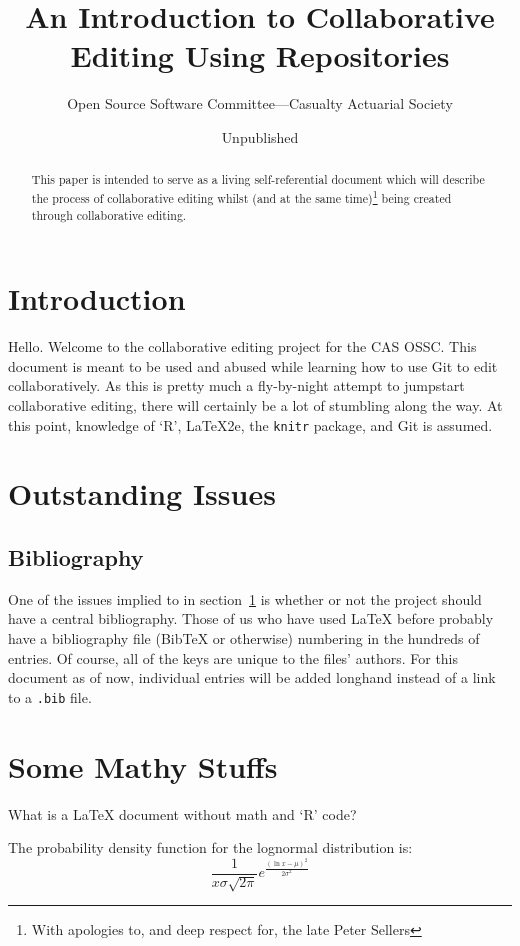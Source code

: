 \documentclass[letterpaper]{article}\usepackage[]{graphicx}\usepackage[]{color}
\begin{document}
\title{An Introduction to Collaborative Editing Using Repositories}
\author{Open Source Software Committee---Casualty Actuarial Society}
\date{Unpublished}

\maketitle
\begin{abstract}
This paper is intended to serve as a living self-referential document which will describe the process of collaborative editing whilst (and at the same time)\footnote{With apologies to, and deep respect for, the late Peter Sellers\citep{TMS219}} being created through collaborative editing.
\end{abstract}
\section{Introduction}\label{Intro}
Hello. Welcome to the collaborative editing project for the CAS OSSC. This document is meant to be used and abused while learning how to use Git to edit collaboratively. As this is pretty much a fly-by-night attempt to jumpstart collaborative editing, there will certainly be a lot of stumbling along the way. At this point, knowledge of `R', \LaTeX2e{}, the \texttt{knitr} package, and Git is assumed. 

\section{Outstanding Issues}\label{Issues}
\subsection{Bibliography}\label{IssueBib}
One of the issues implied to in section~\ref{Intro} is whether or not the project should have a central bibliography. Those of us who have used \LaTeX{} before probably have a bibliography file (BibTeX or otherwise) numbering in the hundreds of entries. Of course, all of the keys are unique to the files' authors. For this document as of now, individual entries will be added longhand instead of a link to a \texttt{.bib} file.

\section{Some Mathy Stuffs}\label{Maths}
What is a \LaTeX{} document without math and `R' code?

The probability density function for the lognormal distribution is:
\begin{equation}
\frac{1}{x\sigma\sqrt{2\pi}}e^{\frac{\left(\ln{x}-\mu\right)^2}{2\sigma^2}}
\end{equation}
\end{document}

